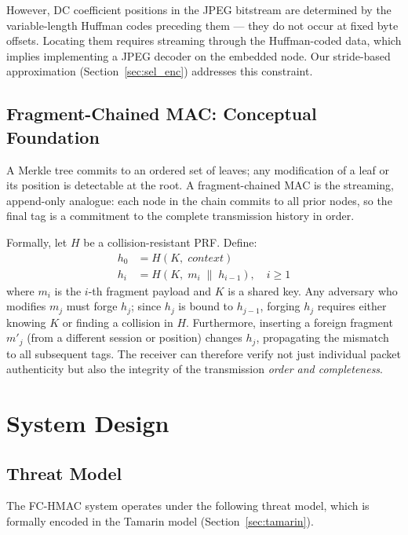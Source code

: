 \documentclass[journal]{IEEEtran}
\begin{document}
However, DC coefficient positions in the JPEG bitstream are determined by the
variable-length Huffman codes preceding them --- they do not occur at fixed byte
offsets.  Locating them requires streaming through the Huffman-coded data, which
implies implementing a JPEG decoder on the embedded node.  Our stride-based
approximation (Section~\ref{sec:sel_enc}) addresses this constraint.

\subsection{Fragment-Chained MAC: Conceptual Foundation}

A Merkle tree \cite{bellare_hmac} commits to an ordered set of leaves; any
modification of a leaf or its position is detectable at the root.  A
fragment-chained MAC is the streaming, append-only analogue: each node in the
chain commits to all prior nodes, so the final tag is a commitment to the
complete transmission history in order.

Formally, let $H$ be a collision-resistant PRF.  Define:
\begin{align}
  h_0 &= H(K,\; \mathit{context}) \label{eq:h0_gen}\\
  h_i &= H(K,\; m_i \;\|\; h_{i-1}), \quad i \geq 1 \label{eq:hi_gen}
\end{align}
where $m_i$ is the $i$-th fragment payload and $K$ is a shared key.  Any
adversary who modifies $m_j$ must forge $h_j$; since $h_j$ is bound to
$h_{j-1}$, forging $h_j$ requires either knowing $K$ or finding a collision in
$H$.  Furthermore, inserting a foreign fragment $m'_j$ (from a different
session or position) changes $h_j$, propagating the mismatch to all
subsequent tags.  The receiver can therefore verify not just individual packet
authenticity but also the integrity of the transmission \emph{order and
completeness}.

\section{System Design}
\label{sec:design}

\subsection{Threat Model}
\label{sec:threat}

The FC-HMAC system operates under the following threat model, which is
formally encoded in the Tamarin model (Section~\ref{sec:tamarin}).
\end{document}
